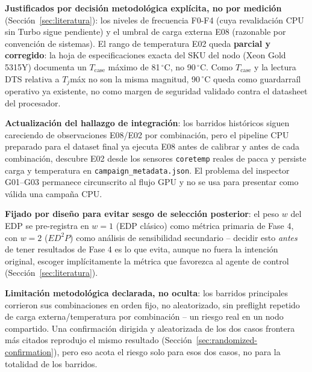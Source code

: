 \textbf{Justificados por decisión metodológica explícita, no por
medición} (Sección~\ref{sec:literatura}): los niveles de frecuencia F0-F4
(cuya revalidación CPU sin Turbo sigue pendiente) y el umbral de carga externa
E08 (razonable por convención de sistemas). El rango de temperatura E02
queda \textbf{parcial y corregido}: la hoja de especificaciones exacta del
SKU del nodo (Xeon Gold 5315Y) documenta un $T_{\text{case}}$ máximo de
81\,$^{\circ}$C, no 90\,$^{\circ}$C. Como $T_{\text{case}}$ y la lectura
DTS relativa a $T_j$máx no son la misma magnitud, 90\,$^{\circ}$C queda
como guardarraíl operativo ya existente, no como margen de seguridad
validado contra el datasheet del procesador.

\textbf{Actualización del hallazgo de integración}: los barridos históricos
siguen careciendo de observaciones E08/E02 por combinación, pero el pipeline
CPU preparado para el dataset final ya ejecuta E08 antes de calibrar y antes
de cada combinación, descubre E02 desde los sensores \texttt{coretemp}
reales de pacca y persiste carga y temperatura en
\texttt{campaign\_metadata.json}. El problema del inspector G01--G03
permanece circunscrito al flujo GPU y no se usa para presentar como válida
una campaña CPU.

\textbf{Fijado por diseño para evitar sesgo de selección posterior}: el
peso $w$ del EDP se pre-registra en $w=1$ (EDP clásico) como métrica
primaria de Fase 4, con $w=2$ ($ED^2P$) como análisis de sensibilidad
secundario -- decidir esto \emph{antes} de tener resultados de Fase 4 es
lo que evita, aunque no fuera la intención original, escoger
implícitamente la métrica que favorezca al agente de control
(Sección~\ref{sec:literatura}).

\textbf{Limitación metodológica declarada, no oculta}: los barridos
principales corrieron sus combinaciones en orden fijo, no aleatorizado,
sin preflight repetido de carga externa/temperatura por combinación -- un
riesgo real en un nodo compartido. Una confirmación dirigida y aleatorizada
de los dos casos frontera más citados reprodujo el mismo resultado
(Sección~\ref{sec:randomized-confirmation}), pero eso acota el riesgo solo
para esos dos casos, no para la totalidad de los barridos.


